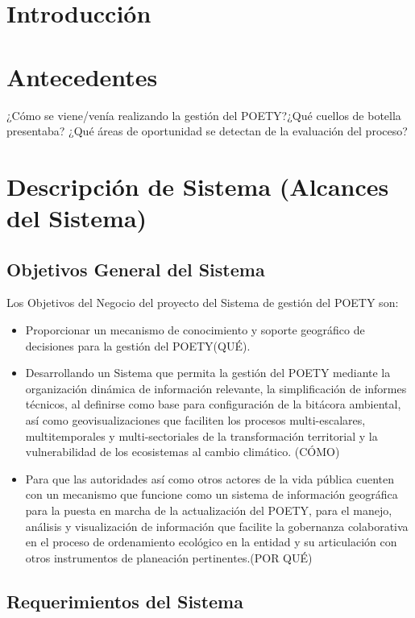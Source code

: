 \section{Introducción}

\section{Antecedentes}

¿Cómo se viene/venía realizando la gestión del POETY?¿Qué cuellos de botella presentaba? ¿Qué áreas de oportunidad se detectan de la evaluación del proceso?
\section{Descripción de Sistema (Alcances del Sistema)}

\subsection{Objetivos General del Sistema}

Los Objetivos del Negocio del proyecto del Sistema de gestión del POETY son:
\begin{itemize}
\item Proporcionar un mecanismo de conocimiento y soporte geográfico de decisiones para la gestión del POETY(QUÉ).
\item Desarrollando un Sistema que permita la gestión del POETY mediante la organización dinámica de información relevante, la simplificación de informes técnicos, al definirse como base para configuración de la bitácora ambiental, así como geovisualizaciones que faciliten los procesos multi-escalares, multitemporales y multi-sectoriales de la transformación territorial y la vulnerabilidad de los ecosistemas al cambio climático. (CÓMO)
\item Para que las autoridades así como otros actores de la vida pública cuenten con un mecanismo que funcione como un sistema de información geográfica para la puesta en marcha de la actualización del POETY, para el manejo, análisis y visualización de información que facilite la gobernanza colaborativa en el proceso de ordenamiento ecológico en la entidad y su articulación con otros instrumentos de planeación pertinentes.(POR QUÉ)
\end{itemize}

\pagebreak
\subsection{Requerimientos del Sistema}


